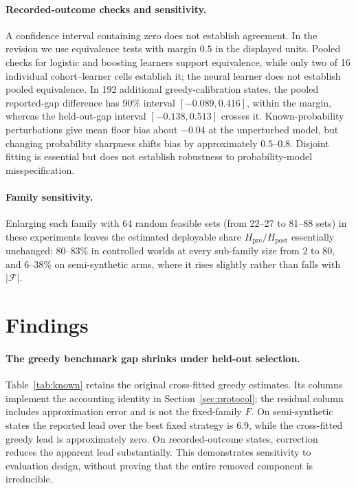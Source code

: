 \documentclass[runningheads]{llncs}
\begin{document}
\paragraph{Recorded-outcome checks and sensitivity.} A confidence interval containing zero does not establish agreement. In the revision we use equivalence tests with margin $0.5$ in the displayed units. Pooled checks for logistic and boosting learners support equivalence, while only two of 16 individual cohort--learner cells establish it; the neural learner does not establish pooled equivalence. In 192 additional greedy-calibration states, the pooled reported-gap difference has 90\% interval $[-0.089,0.416]$, within the margin, whereas the held-out-gap interval $[-0.138,0.513]$ crosses it. Known-probability perturbations give mean floor bias about $-0.04$ at the unperturbed model, but changing probability sharpness shifts bias by approximately $0.5$--$0.8$. Disjoint fitting is essential but does not establish robustness to probability-model misspecification.

\paragraph{Family sensitivity.} Enlarging each family with 64 random feasible sets (from 22--27 to 81--88 sets) in these experiments leaves the estimated deployable share $H_{\mathrm{pre}}/H_{\mathrm{post}}$ essentially unchanged: 80--83\% in controlled worlds at every sub-family size from 2 to 80, and 6--38\% on semi-synthetic arms, where it rises slightly rather than falls with $|\mathcal F|$.

\section{Findings}
\label{sec:findings}
\paragraph{The greedy benchmark gap shrinks under held-out selection.} Table~\ref{tab:known} retains the original cross-fitted greedy estimates. Its columns implement the accounting identity in Section~\ref{sec:protocol}; the residual column includes approximation error and is not the fixed-family $F$. On semi-synthetic states the reported lead over the best fixed strategy is $6.9$, while the cross-fitted greedy lead is approximately zero. On recorded-outcome states, correction reduces the apparent lead substantially. This demonstrates sensitivity to evaluation design, without proving that the entire removed component is irreducible.
\end{document}
